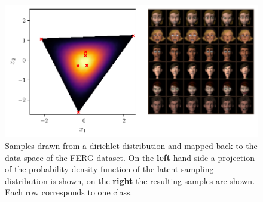 \begin{figure}[htpb]
	\centering
	\includegraphics[width=1\linewidth]{figures/samples/aa_ferg.pdf}
	\caption{Samples drawn from a dirichlet distribution and mapped back to
		the data space of the FERG dataset. On the \textbf{left} hand side a
		projection of the probability density function of the latent
		sampling distribution is shown, on the \textbf{right} the resulting samples
		are shown. Each row corresponds to one class.}%
	\label{fig:aa_ferg}
\end{figure}

